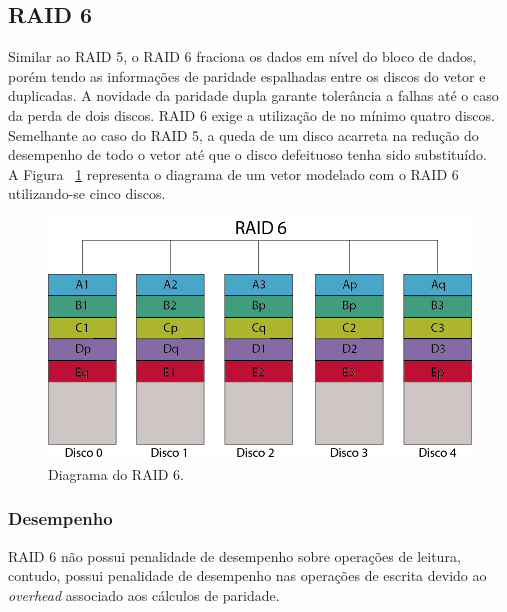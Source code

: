 \subsection{RAID 6}
Similar ao RAID 5, o RAID 6 fraciona os dados em nível do bloco de dados, porém tendo as informações de paridade espalhadas entre os discos do vetor e duplicadas. A novidade da paridade dupla garante tolerância a falhas até o caso da perda de dois discos. RAID 6 exige a utilização de no mínimo quatro discos. \\ 

Semelhante ao caso do RAID 5, a queda de um disco acarreta na redução do desempenho de todo o vetor até que o disco defeituoso tenha sido substituído.\\

A Figura ~\ref{fig:raid6} representa o diagrama de um vetor modelado com o RAID 6 utilizando-se cinco discos.\\

\begin{figure}[htb]
	\begin{center}
		
		\includegraphics[clip,scale=0.5]{images/RAID_6.png}
		\caption{Diagrama do RAID 6. }
		\label{fig:raid6}
	\end{center}
\end{figure} 

\subsubsection{Desempenho}
RAID 6 não possui penalidade de desempenho sobre operações de leitura, contudo, possui penalidade de desempenho nas operações de escrita devido ao \textit{overhead} associado aos cálculos de paridade.\\

